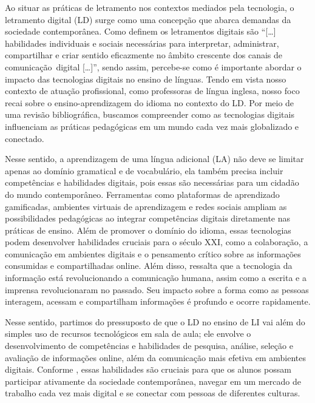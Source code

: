 Ao situar as práticas de letramento nos contextos mediados pela
tecnologia, o letramento digital (LD) surge como uma concepção que
abarca demandas da sociedade contemporânea. Como definem \textcite[p.~17]{dudeney2016letramentos}
 os letramentos digitais são ``{[}\ldots{]}
habilidades individuais e sociais necessárias para interpretar,
administrar, compartilhar e criar sentido eficazmente no âmbito
crescente dos canais de comunicação~digital {[}\ldots{]}'', sendo assim,
percebe-se como é importante abordar o impacto das tecnologias digitais
no ensino de línguas. Tendo em vista nosso contexto de atuação
profissional, como professoras de língua inglesa, nosso foco recai sobre
o ensino-aprendizagem do idioma no contexto do LD. Por meio de uma
revisão bibliográfica, buscamos compreender como as tecnologias digitais
influenciam as práticas pedagógicas em um mundo cada vez mais
globalizado e conectado.

Nesse sentido, a aprendizagem de uma língua adicional (LA) não deve se
limitar apenas ao domínio gramatical e de vocabulário, ela também
precisa incluir competências e habilidades digitais, pois essas são
necessárias para um cidadão do mundo contemporâneo. Ferramentas como
plataformas de aprendizado gamificadas, ambientes virtuais de
aprendizagem e redes sociais ampliam as possibilidades pedagógicas ao
integrar competências digitais diretamente nas práticas de ensino. Além
de promover o domínio do idioma, essas tecnologias podem desenvolver
habilidades cruciais para o século XXI, como a colaboração, a comunicação
em ambientes digitais e o pensamento crítico sobre as informações
consumidas e compartilhadas online. Além disso, \textcite{warschauer2000changing} ressalta que a tecnologia da informação está revolucionando a
comunicação humana, assim como a escrita e a imprensa revolucionaram no
passado. Seu impacto sobre a forma como as pessoas interagem, acessam e
compartilham informações é profundo e ocorre rapidamente.

Nesse sentido, partimos do pressuposto de que o LD no ensino de LI vai
além do simples uso de recursos tecnológicos em sala de aula; ele
envolve o desenvolvimento de competências e habilidades de pesquisa,
análise, seleção e avaliação de informações online, além da comunicação
mais efetiva em ambientes digitais. Conforme \textcite{dudeney2016letramentos}, essas habilidades são cruciais para que os alunos possam
participar ativamente da sociedade contemporânea, navegar em um mercado
de trabalho cada vez mais digital e se conectar com pessoas de
diferentes culturas.

